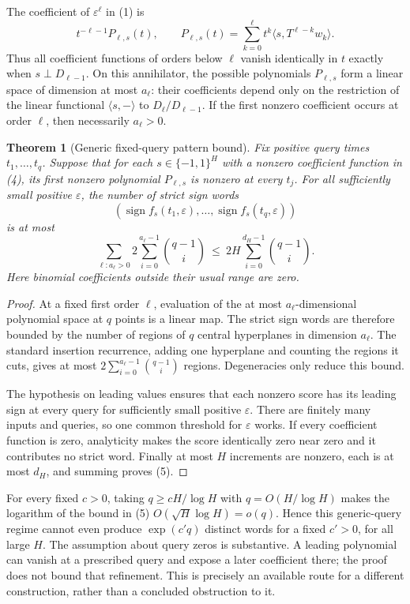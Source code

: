 \documentclass[11pt]{article}
\newtheorem{theorem}{Theorem}
\begin{document}
The coefficient of $\varepsilon^\ell$ in (1) is
\[
 t^{-\ell-1} P_{\ell,s}(t),\qquad
 P_{\ell,s}(t)=\sum_{k=0}^{\ell}
                t^k\langle s,T^{\ell-k}w_k\rangle.
 \tag{4}
\]
Thus all coefficient functions of orders below $\ell$ vanish
identically in $t$ exactly when $s\perp D_{\ell-1}$.
On this annihilator, the possible polynomials $P_{\ell,s}$ form a
linear space of dimension at most $a_\ell$: their coefficients depend
only on the restriction of the linear functional $\langle s,-\rangle$
to $D_\ell/D_{\ell-1}$. If the first nonzero coefficient occurs at
order $\ell$, then necessarily $a_\ell>0$.

\begin{theorem}[Generic fixed-query pattern bound]
Fix positive query times $t_1,\ldots,t_q$. Suppose that for each
$s\in\{-1,1\}^H$ with a nonzero coefficient function in (4), its
first nonzero polynomial $P_{\ell,s}$ is nonzero at every $t_j$.
For all sufficiently small positive $\varepsilon$, the number of
strict sign words
\[
 (\operatorname{sign}f_s(t_1,\varepsilon),\ldots,
  \operatorname{sign}f_s(t_q,\varepsilon))
\]
is at most
\[
 \sum_{\ell:a_\ell>0}
       2\sum_{i=0}^{a_\ell-1}\binom{q-1}{i}
 \ \leq\ 2H\sum_{i=0}^{d_H-1}\binom{q-1}{i}.
 \tag{5}
\]
Here binomial coefficients outside their usual range are zero.
\end{theorem}
\begin{proof}
At a fixed first order $\ell$, evaluation of the at most
$a_\ell$-dimensional polynomial space at $q$ points is a linear map.
The strict sign words are therefore bounded by the number of regions
of $q$ central hyperplanes in dimension $a_\ell$. The standard
insertion recurrence, adding one hyperplane and counting the regions
it cuts, gives at most
$2\sum_{i=0}^{a_\ell-1}\binom{q-1}{i}$ regions. Degeneracies only
reduce this bound.

The hypothesis on leading values ensures that each nonzero score
has its leading sign at every query for sufficiently small positive
$\varepsilon$. There are finitely many inputs and queries, so one
common threshold for $\varepsilon$ works. If every coefficient
function is zero, analyticity makes the score identically zero near
zero and it contributes no strict word. Finally at most $H$ increments
are nonzero, each is at most $d_H$, and summing proves (5).
\end{proof}

For every fixed $c>0$, taking $q\geq cH/\log H$ with
$q=O(H/\log H)$ makes the logarithm of the bound in (5)
$O(\sqrt H\log H)=o(q)$. Hence this generic-query regime cannot even
produce $\exp(c' q)$ distinct words for a fixed $c'>0$, for all large
$H$. The assumption about query zeros is substantive. A leading
polynomial can vanish at a prescribed query and expose a later
coefficient there; the proof does not bound that refinement. This is
precisely an available route for a different construction, rather
than a concluded obstruction to it.
\end{document}
